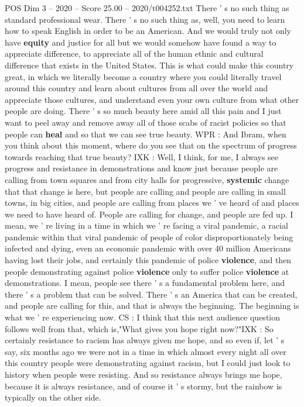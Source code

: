 \begin{textsample}{POS Dim 3 – 2020 – Score 25.00 – 2020/t004252.txt}
There ' s no such thing as standard professional wear.
There ' s no such thing as, well, you need to learn how to speak English in order to be an American.
And we would truly not only have \textbf{equity} and justice for all but we would somehow have found a way to appreciate difference, to appreciate all of the human ethnic and cultural difference that exists in the United States.
This is what could make this country great, in which we literally become a country where you could literally travel around this country and learn about cultures from all over the world and appreciate those cultures, and understand even your own culture from what other people are doing.
There ' s so much beauty here amid all this pain and I just want to peel away and remove away all of those scabs of racist policies so that people can \textbf{heal} and so that we can see true beauty.
WPR : And Ibram, when you think about this moment, where do you see that on the spectrum of progress towards reaching that true beauty?
IXK : Well, I think, for me, I always see progress and resistance in demonstrations and know just because people are calling from town squares and from city halls for progressive, \textbf{systemic} change that that change is here, but people are calling and people are calling in small towns, in big cities, and people are calling from places we ' ve heard of and places we need to have heard of.
People are calling for change, and people are fed up.
I mean, we ' re living in a time in which we ' re facing a viral pandemic, a racial pandemic within that viral pandemic of people of color disproportionately being infected and dying, even an economic pandemic with over 40 million Americans having lost their jobs, and certainly this pandemic of police \textbf{violence}, and then people demonstrating against police \textbf{violence} only to suffer police \textbf{violence} at demonstrations.
I mean, people see there ' s a fundamental problem here, and there ' s a problem that can be solved.
There ' s an America that can be created, and people are calling for this, and that is always the beginning.
The beginning is what we ' re experiencing now.
CS : I think that this next audience question follows well from that, which is,"What gives you hope right now?"IXK : So certainly resistance to racism has always given me hope, and so even if, let ' s say, six months ago we were not in a time in which almost every night all over this country people were demonstrating against racism, but I could just look to history when people were resisting.
And so resistance always brings me hope, because it is always resistance, and of course it ' s stormy, but the rainbow is typically on the other side.

\end{textsample}
